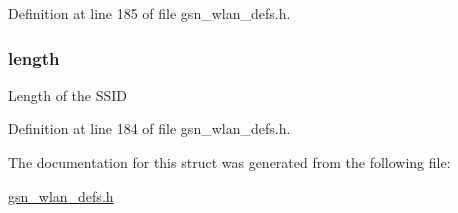 Definition at line 185 of file gsn\_\-wlan\_\-defs.h.

\hypertarget{a00417_ae360fb41f422c7c83b87d9af070cbd31}{
\subsubsection[{length}]{ {\bf length}}}
\label{a00417_ae360fb41f422c7c83b87d9af070cbd31}
Length of the SSID 

Definition at line 184 of file gsn\_\-wlan\_\-defs.h.



The documentation for this struct was generated from the following file:\begin{DoxyCompactItemize}
\item 
\hyperlink{a00614}{gsn\_\-wlan\_\-defs.h}\end{DoxyCompactItemize}
